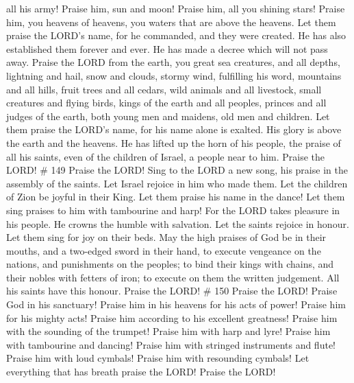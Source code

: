 all his army!  Praise him, sun and moon! Praise him, all you
shining stars!  Praise him, you heavens of heavens, you
waters that are above the heavens.  Let them praise the
LORD's name, for he commanded, and they were created.  He
has also established them forever and ever. He has made a decree which
will not pass away.  Praise the LORD from the earth, you
great sea creatures, and all depths,  lightning and hail,
snow and clouds, stormy wind, fulfilling his word, 
mountains and all hills, fruit trees and all cedars,  wild
animals and all livestock, small creatures and flying birds,
 kings of the earth and all peoples, princes and all judges
of the earth,  both young men and maidens, old men and
children.  Let them praise the LORD's name, for his name
alone is exalted. His glory is above the earth and the heavens.
 He has lifted up the horn of his people, the praise of all
his saints, even of the children of Israel, a people near to him. Praise
the LORD! \# 149  Praise the LORD! Sing to the LORD a new
song, his praise in the assembly of the saints.  Let Israel
rejoice in him who made them. Let the children of Zion be joyful in
their King.  Let them praise his name in the dance! Let them
sing praises to him with tambourine and harp!  For the LORD
takes pleasure in his people. He crowns the humble with salvation.
 Let the saints rejoice in honour. Let them sing for joy on
their beds.  May the high praises of God be in their mouths,
and a two-edged sword in their hand,  to execute vengeance
on the nations, and punishments on the peoples;  to bind
their kings with chains, and their nobles with fetters of iron;
 to execute on them the written judgement. All his saints
have this honour. Praise the LORD! \# 150  Praise the LORD!
Praise God in his sanctuary! Praise him in his heavens for his acts of
power!  Praise him for his mighty acts! Praise him according
to his excellent greatness!  Praise him with the sounding of
the trumpet! Praise him with harp and lyre!  Praise him with
tambourine and dancing! Praise him with stringed instruments and flute!
 Praise him with loud cymbals! Praise him with resounding
cymbals!  Let everything that has breath praise the LORD!
Praise the LORD!
